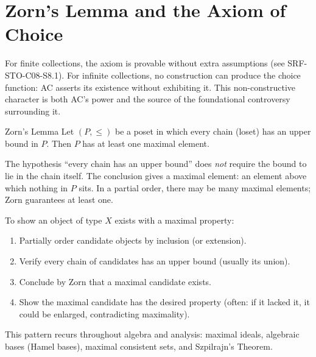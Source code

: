
\section{Zorn's Lemma and the Axiom of Choice}


\begin{remark*}
For finite collections, the axiom is provable without extra assumptions
(see SRF-STO-C08-S8.1). For infinite collections, no construction can
produce the choice function: AC asserts its existence without exhibiting it.
This non-constructive character is both AC's power and the source of the
foundational controversy surrounding it.
\end{remark*}

\begin{theorembox}{Zorn's Lemma}
\label{thm:zorn}
Let $(P, \leq)$ be a poset in which every chain (loset) has an upper bound
in $P$. Then $P$ has at least one maximal element.
\end{theorembox}

\begin{remark*}
The hypothesis ``every chain has an upper bound'' does \emph{not} require
the bound to lie in the chain itself. The conclusion gives a maximal
element: an element above which nothing in $P$ sits. In a partial order,
there may be many maximal elements; Zorn guarantees at least one.
\end{remark*}

\begin{remark*}
To show an object of type $X$ exists with a maximal property:
\begin{enumerate}
  \item Partially order candidate objects by inclusion (or extension).
  \item Verify every chain of candidates has an upper bound (usually its union).
  \item Conclude by Zorn that a maximal candidate exists.
  \item Show the maximal candidate has the desired property (often: if it
        lacked it, it could be enlarged, contradicting maximality).
\end{enumerate}
This pattern recurs throughout algebra and analysis: maximal ideals,
algebraic bases (Hamel bases), maximal consistent sets, and Szpilrajn's Theorem.
\end{remark*}

